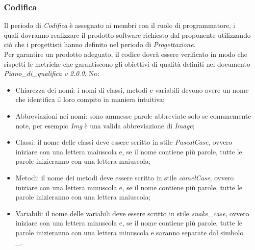 	\subsubsection{Codifica}
	Il periodo di \textit{Codifica} è assegnato ai membri con il ruolo di programmatore, i quali dovranno realizzare il prodotto software richiesto dal proponente utilizzando ciò che i progettisti hanno definito nel periodo di \textit{Progettazione}.\\
	Per garantire un prodotto adeguato, il codice dovrà essere verificato in modo che rispetti le metriche che garantiscono gli obiettivi di qualità definiti nel documento \textit{Piano\_di\_qualifica v 2.0.0}.
	No:
    \begin{itemize}
        \item Chiarezza dei nomi: i nomi di classi, metodi e variabili devono avere un nome che identifica il loro compito in maniera intuitiva;
        \item Abbreviazioni nei nomi: sono ammesse parole abbreviate solo se comunemente note, per esempio \textit{Img} è una valida abbreviazione di \textit{Image};
		\item Classi: il nome delle classi deve essere scritto in stile \textit{PascalCase}, ovvero iniziare con una lettera maiuscola e, se il nome contiene più parole, tutte le parole inizieranno con una lettera maiuscola;
		\item Metodi: il nome dei metodi deve essere scritto in stile \textit{camelCase}, ovvero iniziare con una lettera minuscola e, se il nome contiene più parole, tutte le parole inizieranno con una lettera maiuscola;
		\item Variabili: il nome delle variabili deve essere scritto in stile \textit{snake\_case}, ovvero iniziare con una lettera minuscola e, se il nome contiene più parole, tutte le parole inizieranno con una lettera minuscola e saranno separate dal simbolo \textit{\_}.
    \end{itemize}
    
